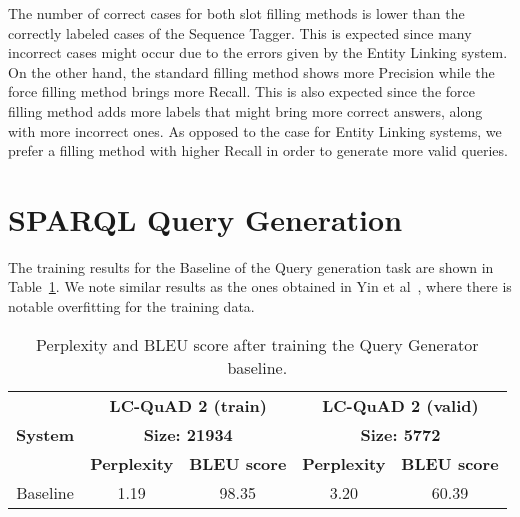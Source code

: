 The number of correct cases for both slot filling methods is lower than the correctly labeled cases 
of the Sequence Tagger. This is expected since many incorrect cases might occur due to the errors 
given by the Entity Linking system. On the other hand, the standard filling method shows more 
Precision while the force filling method brings more Recall. This is also expected since the force 
filling method adds more labels that might bring more correct answers, along with more incorrect 
ones. As opposed to the case for Entity Linking systems, we prefer a filling method with higher 
Recall in order to generate more valid \SPARQL{} queries.

\section{SPARQL Query Generation}
\label{cap5:results/sparqlQuery}

The training results for the Baseline of the \SPARQL{} Query generation task are shown in 
Table~\ref{table:queryGenerationTraining}. We note similar results as the ones obtained in 
Yin et al~\cite{nmt:nl-to-sparql-Yin19}, where there is notable overfitting for the training data.

\begin{table}[h!]
    \centering
    \begin{tabular}{|c|cc|cc|}
    \hline
    \multirow{3}{*}{\textbf{System}} & \multicolumn{2}{c|}{\textbf{LC-QuAD 2 (train)}}                         & \multicolumn{2}{c|}{\textbf{LC-QuAD 2 (valid)}}                         \\ \cline{2-5} 
                                     & \multicolumn{2}{c|}{\textbf{Size: 21934}}                               & \multicolumn{2}{c|}{\textbf{Size: 5772}}                                \\ \cline{2-5} 
                                     & \multicolumn{1}{c|}{\textbf{Perplexity}} & \textbf{BLEU score} & \multicolumn{1}{c|}{\textbf{Perplexity}} & \textbf{BLEU score} \\ \hline
    Baseline                         & 1.19                                     & 98.35               & 3.20                                      & 60.39               \\ \hline
    \end{tabular}%
    \caption{Perplexity and BLEU score after training the \SPARQL{} Query Generator baseline.}
    \label{table:queryGenerationTraining}
\end{table}

